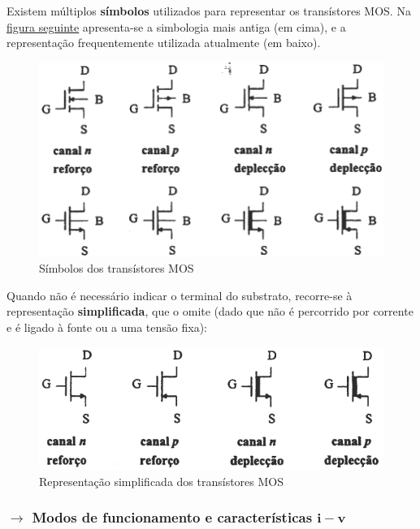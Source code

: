 \begin{mdframed}
    \noindent Existem múltiplos \textbf{símbolos} utilizados para representar os transístores MOS. Na \hyperref[fig:MOS-simbolos]{figura seguinte} apresenta-se a simbologia mais antiga (em cima), e a representação frequentemente utilizada atualmente (em baixo).

    \begin{figure}[H]
        \centering
        \includegraphics[width=0.7\linewidth]{img/3/MOSFET/MOS-simbolos.png}
        \caption{Símbolos dos transístores MOS \cite{medeiros:CTBM}}
        \label{fig:MOS-simbolos}
    \end{figure}

    \noindent Quando não é necessário indicar o terminal do substrato, recorre-se à representação \textbf{simplificada}, que o omite (dado que não é percorrido por corrente e é ligado à fonte ou a uma tensão fixa):

    \begin{figure}[H]
        \centering
        \includegraphics[width=0.65\linewidth]{img/3/MOSFET/MOS-simbolos-simplificado.png}
        \caption{Representação simplificada dos transístores MOS \cite{medeiros:CTBM}}
        \label{fig:MOS-simbolos-simplificado}
    \end{figure}
\end{mdframed}

\newpage
\subsubsection[3.2.1 Modos de funcionamento e características i-v]{$\pmb{\rightarrow}$ Modos de funcionamento e características $\mathbf{i-v}$}

